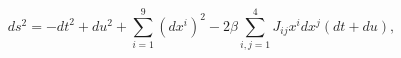 \begin{equation}
\label{metmpp24}
ds^2 = - dt^2 + du^2 + \sum_{i=1}^9 (dx^i)^2 
- 2\beta \sum_{i,j=1}^{4} J_{ij} x^i dx^j (dt+du),
\end{equation}

